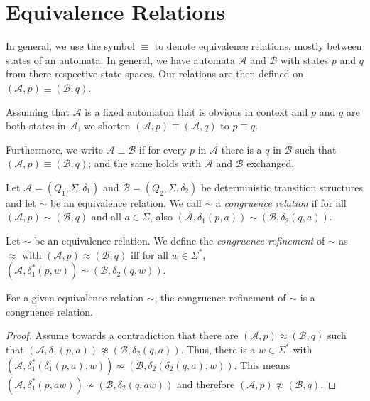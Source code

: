 \section{Equivalence Relations}

In general, we use the symbol $\equiv$ to denote equivalence relations, mostly between states of an automata. In general, we have automata $\mathcal{A}$ and $\mathcal{B}$ with states $p$ and $q$ from there respective state spaces. Our relations are then defined on $(\mathcal{A}, p) \equiv (\mathcal{B}, q)$.

\begin{defn}
	Assuming that $\mathcal{A}$ is a fixed automaton that is obvious in context and $p$ and $q$ are both states in $\mathcal{A}$, we shorten $(\mathcal{A}, p) \equiv (\mathcal{A}, q)$ to $p \equiv q$.
	
	Furthermore, we write $\mathcal{A} \equiv \mathcal{B}$ if for every $p$ in $\mathcal{A}$ there is a $q$ in $\mathcal{B}$ such that $(\mathcal{A}, p) \equiv (\mathcal{B}, q)$; and the same holds with $\mathcal{A}$ and $\mathcal{B}$ exchanged.
\end{defn}

\begin{defn}
	Let $\mathcal{A} = (Q_1, \Sigma, \delta_1)$ and $\mathcal{B} = (Q_2, \Sigma, \delta_2)$ be deterministic transition structures and let $\sim$ be an equivalence relation. We call $\sim$ a \emph{congruence relation} if for all $(\mathcal{A}, p) \sim (\mathcal{B}, q)$ and all $a \in \Sigma$, also $(\mathcal{A}, \delta_1(p, a)) \sim (\mathcal{B}, \delta_2(q, a))$.
\end{defn}

\begin{defn}
	Let $\sim$ be an equivalence relation. We define the \emph{congruence refinement} of $\sim$ as $\approx$ with $(\mathcal{A}, p) \approx (\mathcal{B}, q)$ iff for all $w \in \Sigma^*$, $(\mathcal{A}, \delta_1^*(p, w)) \sim (\mathcal{B}, \delta_2(q, w))$.
\end{defn}

\begin{lem}
	For a given equivalence relation $\sim$, the congruence refinement of $\sim$ is a congruence relation.
\end{lem}

\begin{proof}
	Assume towards a contradiction that there are $(\mathcal{A}, p) \approx (\mathcal{B}, q)$ such that $(\mathcal{A}, \delta_1(p, a)) \not\approx (\mathcal{B}, \delta_2(q, a))$. Thus, there is a $w \in \Sigma^*$ with $(\mathcal{A}, \delta_1^*(\delta_1(p, a), w)) \not\sim (\mathcal{B}, \delta_2(\delta_2(q, a), w))$. This means $(\mathcal{A}, \delta_1^*(p, aw)) \not\sim (\mathcal{B}, \delta_2(q, aw))$ and therefore $(\mathcal{A}, p) \not\approx (\mathcal{B}, q)$.
\end{proof}

